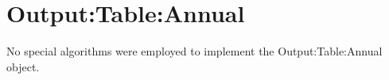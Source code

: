 \section{Output:Table:Annual}\label{outputtableannual}

No special algorithms were employed to implement the Output:Table:Annual object.
